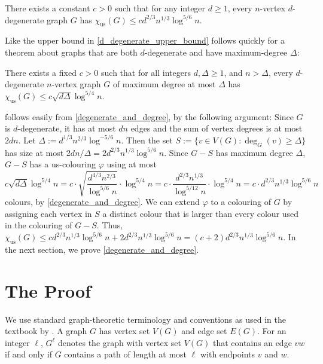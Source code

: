 \documentclass{patmorin}
\newcommand{\trn}{\chi_{\mathrm{us}}}
\begin{document}
\begin{thm}\label{d_degenerate_upper_bound}
  There exists a constant $c>0$ such that for any integer $d\ge 1$, every $n$-vertex $d$-degenerate graph $G$ has $\trn(G) \le c d^{2/3} n^{1/3}\log^{5/6}  n$.
\end{thm}

Like the upper bound in \cite{karpas.neiman.ea:on} \cref{d_degenerate_upper_bound} follows quickly for a theorem about graphs that are both $d$-degenerate and have maximum-degree $\Delta$:

\begin{thm}\label{degenerate_and_degree}
  There exists a fixed $c>0$ such that
  for all integers $d,\Delta \ge 1$, and $n> \Delta$, every $d$-degenerate $n$-vertex graph $G$ of maximum degree at most $\Delta$ has
  $\trn(G)\leq c \sqrt{d\Delta}\log^{5/4} n$.
\end{thm}

 follows easily from \cref{degenerate_and_degree}, by the following argument:  Since $G$ is $d$-degenerate, it has at most $dn$ edges and the sum of vertex degrees is at most $2dn$.  Let $\Delta:=d^{1/3}n^{2/3}\log^{-5/6} n$.  Then the set $S:=\{v\in V(G):\deg_G(v)\ge \Delta\}$ has size at most $2dn/\Delta=2d^{2/3}n^{1/3}\log^{5/6} n$.  Since $G-S$ has maximum degree $\Delta$, $G-S$ has a us-colouring $\varphi$ using at most
\[
  c\sqrt{d\Delta}\log^{5/4} n
  = c\cdot \sqrt{\frac{d^{4/3}n^{2/3}}{\log^{5/6} n}}\cdot \log^{5/4} n
  = c\cdot \frac{d^{2/3}n^{1/3}}{\log^{5/12} n}\cdot \log^{5/4} n
  = c\cdot d^{2/3}n^{1/3}\log^{5/6} n
\]
 colours, by \cref{degenerate_and_degree}. We can extend $\varphi$ to a colouring of $G$ by assigning each vertex in $S$ a distinct colour that is larger than every colour used in the colouring of $G-S$.  Thus, $\trn(G)\le cd^{2/3}n^{1/3}\log^{5/6} n+2d^{2/3}n^{1/3}\log^{5/6} n= (c+2)d^{2/3}n^{1/3}\log^{5/6} n$.  In the next section, we prove \cref{degenerate_and_degree}.


\section{The Proof}

We use standard graph-theoretic terminology and conventions as used in the textbook by \citet{diestel:graph}. A graph $G$ has vertex set $V(G)$ and edge set $E(G)$.  For an integer $\ell$, $G^\ell$ denotes the graph with vertex set $V(G)$ that contains an edge $vw$ if and only if $G$ contains a path of length at most $\ell$ with endpoints $v$ and $w$.
\end{document}
